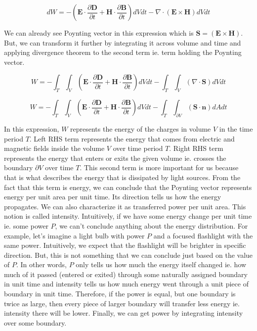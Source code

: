 \documentclass{article}
\begin{document}
\[ dW = -(\mathbf{E} \cdot \frac{\partial \mathbf{D}}{\partial t} + \mathbf{H} \cdot \frac{\partial \mathbf{B}}{\partial t})dVdt - \nabla \cdot (\mathbf{E} \times \mathbf{H})dVdt \]

We can already see Poynting vector in this expression which is $\mathbf{S} = (\mathbf{E} \times \mathbf{H})$. But, we can transform it further by integrating it across volume and time and applying divergence theorem to the second term ie. term holding the Poynting vector.

\[ W = -\int_{T}\int_{V}(\mathbf{E} \cdot \frac{\partial \mathbf{D}}{\partial t} + \mathbf{H} \cdot \frac{\partial \mathbf{B}}{\partial t})dVdt - \int_{T}\int_{V}(\nabla \cdot \mathbf{S}) dVdt \]

\[ W = -\int_{T}\int_{V}(\mathbf{E} \cdot \frac{\partial \mathbf{D}}{\partial t} + \mathbf{H} \cdot \frac{\partial \mathbf{B}}{\partial t})dVdt - \int_{T}\int_{\partial V}(\mathbf{S} \cdot \mathbf{n} )dAdt \]

In this expression, $W$ represents the energy of the charges in volume $V$ in the time period $T$. Left RHS term represents the energy that comes from electric and magnetic fields inside the volume $V$ over time period $T$. Right RHS term represents the energy that enters or exits the given volume ie. crosses the boundary $\partial V$ over time $T$. This second term is more important for us because that is what describes the energy that is dissipated by light sources. From the fact that this term is energy, we can conclude that the Poynting vector represents energy per unit area per unit time. Its direction tells us how the energy propagates. We can also characterize it as transferred power per unit area. This notion is called intensity. Intuitively, if we have some energy change per unit time ie. some power $P$, we can't conclude anything about the energy distribution. For example, let's imagine a light bulb with power $P$ and a focused flashlight with the same power. Intuitively, we expect that the flashlight will be brighter in specific direction. But, this is not something that we can conclude just based on the value of $P$. In other words, $P$ only tells us how much the energy itself changed ie. how much of it passed (entered or exited) through some naturally assigned boundary in unit time and intensity tells us how much energy went through a unit piece of boundary in unit time. Therefore, if the power is equal, but one boundary is twice as large, then every piece of larger boundary will transfer less energy ie. intensity there will be lower. Finally, we can get power by integrating intensity over some boundary.
\end{document}
